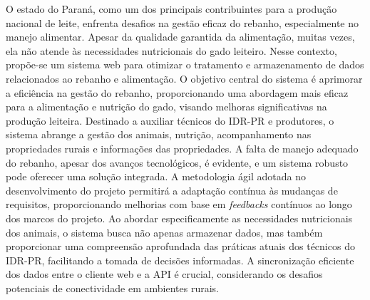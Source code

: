 
\begin{resumoutfpr}%
  O estado do Paraná, como um dos principais contribuintes para a produção nacional de leite, enfrenta desafios na gestão eficaz do rebanho, especialmente no manejo alimentar. Apesar da qualidade garantida da alimentação, muitas vezes, ela não atende às necessidades nutricionais do gado leiteiro. Nesse contexto, propõe-se um sistema web para otimizar o tratamento e armazenamento de dados relacionados ao rebanho e alimentação. O objetivo central do sistema é aprimorar a eficiência na gestão do rebanho, proporcionando uma abordagem mais eficaz para a alimentação e nutrição do gado, visando melhoras significativas na produção leiteira. Destinado a auxiliar técnicos do \gls{IDR-PR} e produtores, o sistema abrange a gestão dos animais, nutrição, acompanhamento nas propriedades rurais e informações das propriedades. A falta de manejo adequado do rebanho, apesar dos avanços tecnológicos, é evidente, e um sistema robusto pode oferecer uma solução integrada. A metodologia ágil adotada no desenvolvimento do projeto permitirá a adaptação contínua às mudanças de requisitos, proporcionando melhorias com base em \textit{feedbacks} contínuos ao longo dos marcos do projeto. Ao abordar especificamente as necessidades nutricionais dos animais, o sistema busca não apenas armazenar dados, mas também proporcionar uma compreensão aprofundada das práticas atuais dos técnicos do \gls{IDR-PR}, facilitando a tomada de decisões informadas. A sincronização eficiente dos dados entre o cliente web e a API é crucial, considerando os desafios potenciais de conectividade em ambientes rurais.
\end{resumoutfpr}
